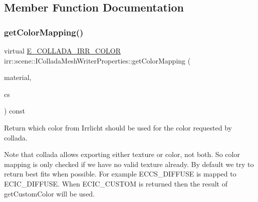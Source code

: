 \subsection{Member Function Documentation}
\mbox{\label{classirr_1_1scene_1_1IColladaMeshWriterProperties_ab347c50cc9b291625d051a919d8772ab}} 
\subsubsection{\texorpdfstring{get\+Color\+Mapping()}{getColorMapping()}\hspace{0.1cm}{\footnotesize\ttfamily [1/2]}}
{\footnotesize\ttfamily virtual \hyperlink{namespaceirr_1_1scene_a61cba210038d6d843b81d9282f1cac7e}{E\+\_\+\+C\+O\+L\+L\+A\+D\+A\+\_\+\+I\+R\+R\+\_\+\+C\+O\+L\+OR} irr\+::scene\+::\+I\+Collada\+Mesh\+Writer\+Properties\+::get\+Color\+Mapping (\begin{DoxyParamCaption}\item[{const \hyperlink{classirr_1_1video_1_1SMaterial}{video\+::\+S\+Material} \&}]{material,  }\item[{\hyperlink{namespaceirr_1_1scene_a6204218341c6b449d879cd8367b2f8d8}{E\+\_\+\+C\+O\+L\+L\+A\+D\+A\+\_\+\+C\+O\+L\+O\+R\+\_\+\+S\+A\+M\+P\+L\+ER}}]{cs }\end{DoxyParamCaption}) const\hspace{0.3cm}{\ttfamily [pure virtual]}}



Return which color from Irrlicht should be used for the color requested by collada. 

Note that collada allows exporting either texture or color, not both. So color mapping is only checked if we have no valid texture already. By default we try to return best fits when possible. For example E\+C\+C\+S\+\_\+\+D\+I\+F\+F\+U\+SE is mapped to E\+C\+I\+C\+\_\+\+D\+I\+F\+F\+U\+SE. When E\+C\+I\+C\+\_\+\+C\+U\+S\+T\+OM is returned then the result of get\+Custom\+Color will be used. \mbox{\label{classirr_1_1scene_1_1IColladaMeshWriterProperties_ab347c50cc9b291625d051a919d8772ab}} 
